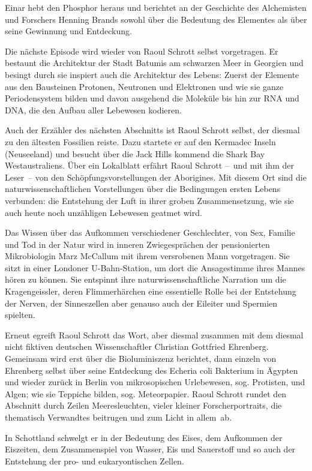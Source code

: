 Einar hebt den Phosphor heraus und berichtet an der Geschichte des Alchemisten
  und Forschers Henning Brands sowohl über die Bedeutung des Elementes als
  über seine Gewinnung und Entdeckung.

Die nächste Episode wird wieder von Raoul Schrott selbst vorgetragen.
Er bestaunt die Architektur der Stadt Batumis am schwarzen Meer in Georgien und besingt
  durch sie inspiert auch die Architektur des Lebens: Zuerst der Elemente aus
  den Bausteinen Protonen, Neutronen und Elektronen und wie sie ganze
  Periodensystem bilden und davon ausgehend die Moleküle bis hin zur RNA und
  DNA, die den Aufbau aller Lebewesen kodieren.

Auch der Erzähler des nächsten Abschnitts ist Raoul Schrott selbst, der
  diesmal zu den ältesten Fossilien reiste.
Dazu startete er auf den Kermadec Inseln (Neuseeland) und besucht über die
  Jack Hills kommend die Shark Bay Westaustraliens.
Über ein Lokalblatt erfährt Raoul Schrott --~und mit ihm der Leser~-- von den
  Schöpfungsvorstellungen der Aborigines.
Mit diesem Ort sind die naturwissenschaftlichen Vorstellungen über die
  Bedingungen ersten Lebens verbunden: \ZB die Entstehung der Luft in ihrer
  groben Zusammensetzung, wie sie auch heute noch unzähligen Lebewesen geatmet
  wird.

Das Wissen über das Aufkommen verschiedener Geschlechter, von Sex, Familie und
  Tod in der Natur wird in inneren Zwiegesprächen der pensionierten
  Mikrobiologin Marz McCallum mit ihrem versrobenen Mann vorgetragen.
Sie sitzt in einer Londoner U-Bahn-Station, um dort die Ansagestimme ihres
  Mannes hören zu können.
Sie entspinnt ihre naturwissenschaftliche Narration um die Kragengeissler,
deren Flimmerhärchen eine essentielle Rolle bei der Entstehung der Nerven, der
  Sinneszellen aber genauso auch der Eileiter und Spermien spielten.

Erneut egreift Raoul Schrott das Wort, aber diesmal zusammen mit dem diesmal
  nicht fiktiven deutschen Wissenschaftler Christian Gottfried Ehrenberg.
Gemeinsam wird erst über die Bioluminiszenz berichtet, dann einzeln von
  Ehrenberg selbst über seine Entdeckung des Echeria coli Bakterium in Ägypten
  und wieder zurück in Berlin von mikrosopischen Urlebewesen, sog. Protisten,
  und Algen; wie sie Teppiche bilden, sog. Meteorpapier.
Raoul Schrott rundet den Abschnitt durch Zeilen Meeresleuchten, vieler kleiner
  Forscherportraits, die thematisch Verwandtes beitrugen und zum \glqq Licht
  in allem\grqq\ ab.

In Schottland schwelgt er in der Bedeutung des Eises, dem Aufkommen der
  Eiszeiten, dem Zusammenspiel von Wasser, Eis und Sauerstoff und so auch der
  Entstehung der pro- und eukaryontischen Zellen.

